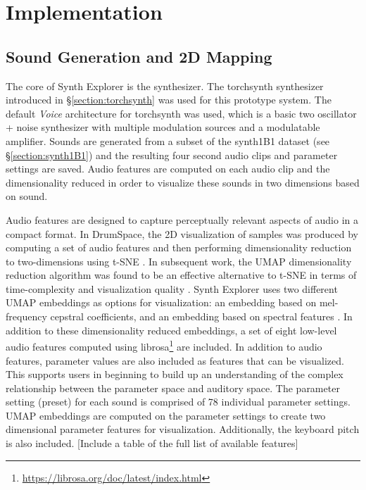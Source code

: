 \section{Implementation}
\subsection{Sound Generation and 2D Mapping}
The core of Synth Explorer is the synthesizer. The torchsynth synthesizer introduced in \S\ref{section:torchsynth} was used for this prototype system. The default \textit{Voice} architecture for torchsynth was used, which is a basic two oscillator + noise synthesizer with multiple modulation sources and a modulatable amplifier. Sounds are generated from a subset of the synth1B1 dataset (see \S\ref{section:synth1B1}) and the resulting four second audio clips and parameter settings are saved. Audio features are computed on each audio clip and the dimensionality reduced in order to visualize these sounds in two dimensions based on sound.

Audio features are designed to capture perceptually relevant aspects of audio in a compact format. In DrumSpace, the 2D visualization of samples was produced by computing a set of audio features and then performing dimensionality reduction to two-dimensions using t-SNE \cite{turquois2016exploring, van2008visualizing}. In subsequent work, the UMAP dimensionality reduction algorithm \cite{mcinnes2020umap} was found to be an effective alternative to t-SNE in terms of time-complexity and visualization quality \cite{jiale2020visualization}. Synth Explorer uses two different UMAP embeddings as options for visualization: an embedding based on mel-frequency cepstral coefficients, and an embedding based on spectral features \cite{peeters2004large}. In addition to these dimensionality reduced embeddings, a set of eight low-level audio features computed using librosa\footnote{\url{https://librosa.org/doc/latest/index.html}} are included. In addition to audio features, parameter values are also included as features that can be visualized. This supports users in beginning to build up an understanding of the complex relationship between the parameter space and auditory space. The parameter setting (preset) for each sound is comprised of 78 individual parameter settings. UMAP embeddings are computed on the parameter settings to create two dimensional parameter features for visualization. Additionally, the keyboard pitch is also included.
[Include a table of the full list of available features]


